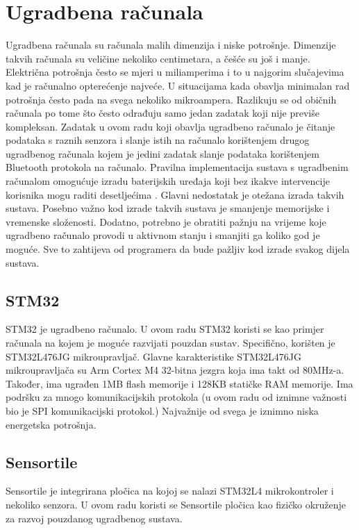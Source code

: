 \documentclass[times, utf8, diplomski]{diplomski}
\begin{document}
\chapter{Ugradbena računala}
Ugradbena računala su računala malih dimenzija i niske potrošnje. Dimenzije takvih računala su veličine nekoliko centimetara, a češće su još i manje.
Električna potrošnja često se mjeri u miliamperima i to u najgorim slučajevima kad je računalno opterećenje najveće.
U situacijama kada obavlja minimalan rad potrošnja često pada na svega nekoliko mikroampera.
Razlikuju se od običnih računala po tome što često odrađuju samo jedan zadatak koji nije previše kompleksan.
Zadatak u ovom radu koji obavlja ugradbeno računalo je čitanje podataka s raznih senzora i slanje istih na računalo korištenjem drugog ugradbenog
računala kojem je jedini zadatak slanje podataka korištenjem Bluetooth protokola na računalo.
Pravilna implementacija sustava s ugradbenim računalom omogućuje izradu baterijskih uređaja koji bez ikakve intervencije korisnika mogu raditi desetljećima \cite{holosys}. 
Glavni nedostatak je otežana izrada takvih sustava. Posebno važno kod izrade takvih sustava je smanjenje memorijske i vremenske složenosti.
Dodatno, potrebno je obratiti pažnju na vrijeme koje ugradbeno računalo provodi u aktivnom stanju i smanjiti ga koliko god je moguće.
Sve to zahtijeva od programera da bude pažljiv kod izrade svakog dijela sustava.


\section{STM32}
STM32 \cite{STM32L476JG} je ugradbeno računalo. U ovom radu STM32 koristi se kao primjer računala na kojem je moguće razvijati pouzdan sustav.
Specifično, korišten je STM32L476JG mikroupravljač.
Glavne karakteristike STM32L476JG mikroupravljača su Arm Cortex M4 32-bitna jezgra koja ima takt od 80MHz-a.
Također, ima ugrađen 1MB flash memorije i 128KB statičke RAM memorije.
Ima podršku za mnogo komunikacijskih protokola (u ovom radu od iznimne važnosti bio je SPI komunikacijski protokol.)
Najvažnije od svega je iznimno niska energetska potrošnja.

\section{Sensortile}
Sensortile \cite{sensortile} je integrirana pločica na kojoj se nalazi STM32L4 mikrokontroler i nekoliko senzora. U ovom radu koristi se Sensortile pločica kao fizičko okruženje za razvoj pouzdanog ugradbenog sustava.
 
\end{document}
